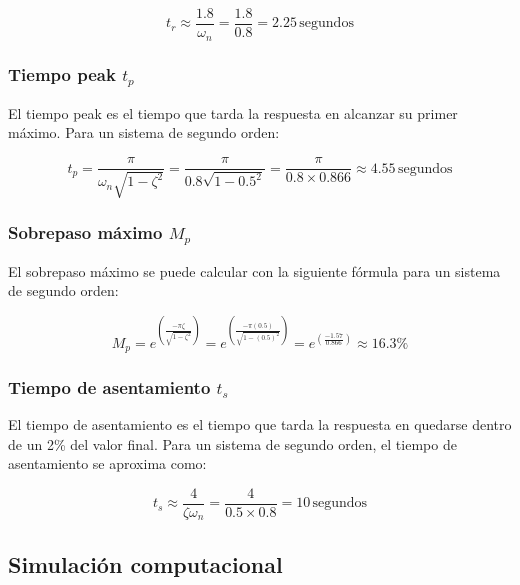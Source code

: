 \documentclass[10pt]{article}
\theoremstyle{definition}
\theoremstyle{remark}
\theoremstyle{definition}
\numberwithin{equation}{prob}
\begin{document}
\[
t_r \approx \frac{1.8}{\omega_n} = \frac{1.8}{0.8} = 2.25 \, \text{segundos}
\]

\subsubsection{Tiempo peak \texorpdfstring{\(t_p\)}{tp}}

El tiempo peak es el tiempo que tarda la respuesta en alcanzar su primer máximo. Para un sistema de segundo orden:

\[
t_p = \frac{\pi}{\omega_n \sqrt{1 - \zeta^2}} = \frac{\pi}{0.8 \sqrt{1 - 0.5^2}} = \frac{\pi}{0.8 \times 0.866} \approx 4.55 \, \text{segundos}
\]

\subsubsection{Sobrepaso máximo \texorpdfstring{\(M_p\)}{Mp}}

El sobrepaso máximo se puede calcular con la siguiente fórmula para un sistema de segundo orden:

\[
M_p = e^{\left(\frac{-\pi \zeta}{\sqrt{1 - \zeta^2}}\right)} = e^{\left(\frac{-\pi (0.5)}{\sqrt{1 - (0.5)^2}}\right)} = e^{\left(\frac{-1.57}{0.866}\right)} \approx 16.3\%
\]

\subsubsection{Tiempo de asentamiento \texorpdfstring{\(t_s\)}{ts}}

El tiempo de asentamiento es el tiempo que tarda la respuesta en quedarse dentro de un 2\% del valor final. Para un sistema de segundo orden, el tiempo de asentamiento se aproxima como:

\[
t_s \approx \frac{4}{\zeta \omega_n} = \frac{4}{0.5 \times 0.8} = 10 \, \text{segundos}
\]

\subsection{Simulación computacional}
\end{document}
